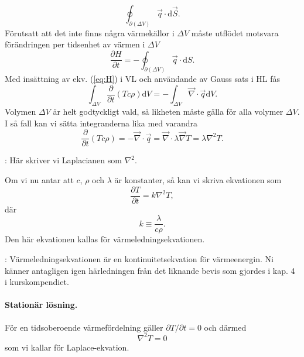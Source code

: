 \documentclass[%
oneside,                 %
final,                   %
10pt]{article}
\newcommand{\shortinlinecomment}[3]{{\color{red}{\bf #1}: #2}}
\newcommand{\longinlinecomment}[3]{{\color{red}{\bf #1}: #2}}
\begin{document}
\noindent
\begin{equation}
  \oint_{\partial (\Delta V)} \vec{q}\cdot \mbox{d}\vec{S}.
\end{equation}
Förutsatt att det inte finns några värmekällor i $\Delta V$  måste 
utflödet motsvara förändringen per tidsenhet av värmen
i $\Delta V$
\begin{equation}
  \frac{\partial H}{\partial t} = - \oint_{\partial (\Delta V)} {\vec{q}\cdot \mbox{d}S}.
\end{equation}
Med insättning av ekv. (\ref{eq:H}) i VL och användande av Gauss sats i HL fås
\begin{equation}
  \int_{\Delta V}
\frac{\partial}{\partial t} \left( Tc\rho \right) \mbox{d}V = -\int_{\Delta V} \vec{\nabla} \cdot \vec{q}\mbox{d}V.
\label{energi}
\end{equation}
Volymen $\Delta V$ är helt godtyckligt vald, så likheten måste gälla för alla volymer $\Delta V$. I så fall kan vi sätta integranderna lika med varandra
\begin{equation}
  \frac{\partial}{\partial t}\left(T c\rho\right) = - \vec{\nabla} \cdot \vec{q}
= \vec{\nabla} \cdot \lambda \vec{\nabla} T = \lambda \nabla^2 T.
\end{equation}

\shortinlinecomment{Comment 2}{ Här skriver vi Laplacianen som $\nabla^2$. }{ Här skriver vi Laplacianen }

Om vi nu antar att $c$, $\rho$ och $\lambda$  är konstanter, så kan vi skriva ekvationen som
\begin{equation}
  \frac{\partial T}{\partial t} = k \nabla^2 T,
\end{equation}
där 
\begin{equation}
  k \equiv \frac{\lambda}{c\rho}.
\end{equation}
Den här ekvationen kallas för värmeledningsekvationen. 

\longinlinecomment{Comment 3}{ Värmeledningsekvationen är en kontinuitetsekvation för värmeenergin. Ni känner antagligen igen härledningen från det liknande bevis som gjordes i kap. 4 i kurskompendiet. }{ Värmeledningsekvationen är en kontinuitetsekvation }

\paragraph{Stationär lösning.}
För en tidsoberoende värmefördelning gäller $\partial T / \partial t = 0$ och därmed
\begin{equation}
  \nabla^2 T = 0
\end{equation}
som vi kallar för Laplace-ekvation.
\end{document}
